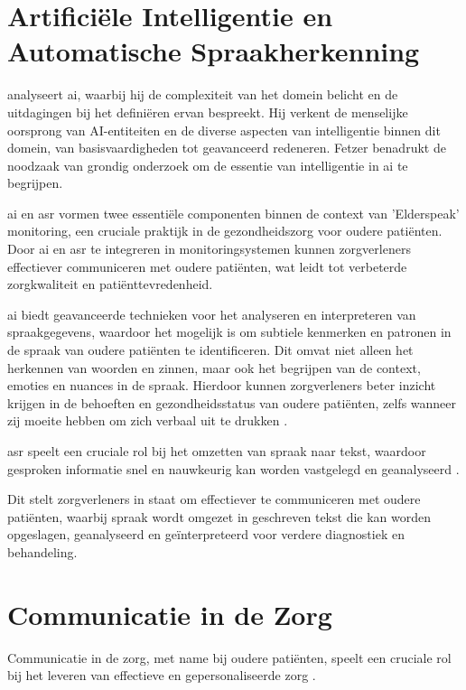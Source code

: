\section{Artificiële Intelligentie en Automatische Spraakherkenning}

\textcite{Fetzer_1990} analyseert \gls{ai}, waarbij hij de complexiteit van het domein belicht en de uitdagingen bij het definiëren ervan bespreekt. Hij verkent de menselijke oorsprong van AI-entiteiten en de diverse aspecten van intelligentie binnen dit domein, van basisvaardigheden tot geavanceerd redeneren. Fetzer benadrukt de noodzaak van grondig onderzoek om de essentie van intelligentie in \gls{ai} te begrijpen.

\gls{ai} en \gls{asr} vormen twee essentiële componenten binnen de context van 'Elderspeak' monitoring, een cruciale praktijk in de gezondheidszorg voor oudere patiënten. Door \gls{ai} en \gls{asr} te integreren in monitoringsystemen kunnen zorgverleners effectiever communiceren met oudere patiënten, wat leidt tot verbeterde zorgkwaliteit en patiënttevredenheid.

\gls{ai} biedt geavanceerde technieken voor het analyseren en interpreteren van spraakgegevens, waardoor het mogelijk is om subtiele kenmerken en patronen in de spraak van oudere patiënten te identificeren. Dit omvat niet alleen het herkennen van woorden en zinnen, maar ook het begrijpen van de context, emoties en nuances in de spraak. Hierdoor kunnen zorgverleners beter inzicht krijgen in de behoeften en gezondheidsstatus van oudere patiënten, zelfs wanneer zij moeite hebben om zich verbaal uit te drukken \autocite{young2002,jabraf2019}.

\gls{asr} speelt een cruciale rol bij het omzetten van spraak naar tekst, waardoor gesproken informatie snel en nauwkeurig kan worden vastgelegd en geanalyseerd \autocite{rabiner1993fundamentals,jabraf2017}.

Dit stelt zorgverleners in staat om effectiever te communiceren met oudere patiënten, waarbij spraak wordt omgezet in geschreven tekst die kan worden opgeslagen, geanalyseerd en geïnterpreteerd voor verdere diagnostiek en behandeling.

\section{Communicatie in de Zorg}
Communicatie in de zorg, met name bij oudere patiënten, speelt een cruciale rol bij het leveren van effectieve en gepersonaliseerde zorg \autocite{smith2020}.

